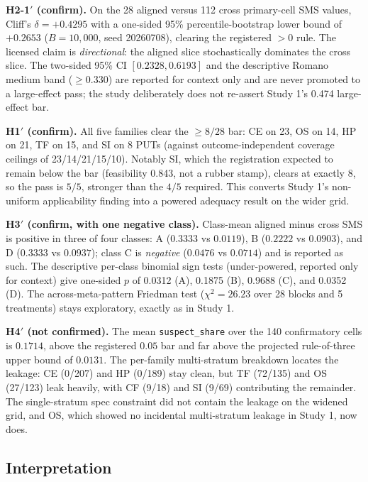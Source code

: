 \documentclass[manuscript,screen,review]{acmart}
\begin{document}
\textbf{H2-1\('\) (confirm).} On the 28 aligned versus 112 cross
primary-cell SMS values, Cliff's \(\delta = +0.4295\) with a one-sided
95\% percentile-bootstrap lower bound of \(+0.2653\) (\(B = 10{,}000\),
seed 20260708), clearing the registered \(>0\) rule. The licensed claim
is \emph{directional}: the aligned slice stochastically dominates the
cross slice. The two-sided 95\% CI \([0.2328, 0.6193]\) and the
descriptive Romano medium band (\(\geq 0.330\)) are reported for context
only and are never promoted to a large-effect pass; the study
deliberately does not re-assert Study 1's 0.474 large-effect bar.

\textbf{H1\('\) (confirm).} All five families clear the \(\geq 8/28\)
bar: CE on 23, OS on 14, HP on 21, TF on 15, and SI on 8 PUTs (against
outcome-independent coverage ceilings of 23/14/21/15/10). Notably SI,
which the registration expected to remain below the bar (feasibility
0.843, not a rubber stamp), clears at exactly 8, so the pass is
\(5/5\), stronger than the \(4/5\) required. This converts Study 1's
non-uniform applicability finding into a powered adequacy result on the
wider grid.

\textbf{H3\('\) (confirm, with one negative class).} Class-mean aligned
minus cross SMS is positive in three of four classes: A
(\(0.3333\) vs \(0.0119\)), B (\(0.2222\) vs \(0.0903\)), and D
(\(0.3333\) vs \(0.0937\)); class C is \emph{negative}
(\(0.0476\) vs \(0.0714\)) and is reported as such. The descriptive
per-class binomial sign tests (under-powered, reported only for context)
give one-sided \(p\) of 0.0312 (A), 0.1875 (B), 0.9688 (C), and 0.0352
(D). The across-meta-pattern Friedman test
(\(\chi^2 = 26.23\) over 28 blocks and 5 treatments) stays exploratory,
exactly as in Study 1.

\textbf{H4\('\) (not confirmed).} The mean \texttt{suspect\_share} over
the 140 confirmatory cells is \(0.1714\), above the registered \(0.05\)
bar and far above the projected rule-of-three upper bound of \(0.0131\).
The per-family multi-stratum breakdown locates the leakage: CE
(0/207) and HP (0/189) stay clean, but TF (72/135) and OS (27/123) leak
heavily, with CF (9/18) and SI (9/69) contributing the remainder. The
single-stratum spec constraint did not contain the leakage on the widened
grid, and OS, which showed no incidental multi-stratum leakage in Study
1, now does.

\subsection{Interpretation}\label{study2-interpretation}
\end{document}
